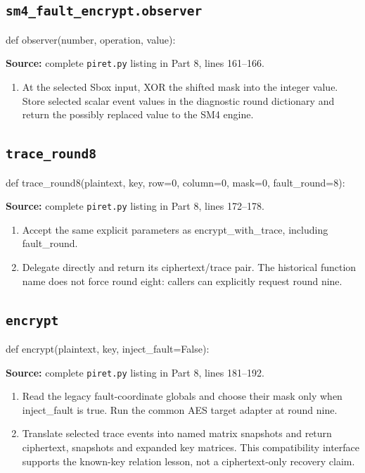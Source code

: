 \subsection{\texttt{sm4\_\allowbreak{}fault\_\allowbreak{}encrypt.observer}}
\begin{lightcode}
def observer(number, operation, value):
\end{lightcode}
\noindent\textbf{Source:} complete \texttt{piret.py} listing in Part 8, lines 161--166.
\begin{enumerate}
\item At the selected Sbox input, XOR the shifted mask into the integer value. Store selected scalar event values in the diagnostic round dictionary and return the possibly replaced value to the SM4 engine.
\end{enumerate}
\subsection{\texttt{trace\_\allowbreak{}round8}}
\begin{lightcode}
def trace_round8(plaintext, key, row=0, column=0, mask=0, fault_round=8):
\end{lightcode}
\noindent\textbf{Source:} complete \texttt{piret.py} listing in Part 8, lines 172--178.
\begin{enumerate}
\item Accept the same explicit parameters as encrypt\_with\_trace, including fault\_round.
\item Delegate directly and return its ciphertext/trace pair. The historical function name does not force round eight: callers can explicitly request round nine.
\end{enumerate}
\subsection{\texttt{encrypt}}
\begin{lightcode}
def encrypt(plaintext, key, inject_fault=False):
\end{lightcode}
\noindent\textbf{Source:} complete \texttt{piret.py} listing in Part 8, lines 181--192.
\begin{enumerate}
\item Read the legacy fault-coordinate globals and choose their mask only when inject\_fault is true. Run the common AES target adapter at round nine.
\item Translate selected trace events into named matrix snapshots and return ciphertext, snapshots and expanded key matrices. This compatibility interface supports the known-key relation lesson, not a ciphertext-only recovery claim.
\end{enumerate}
